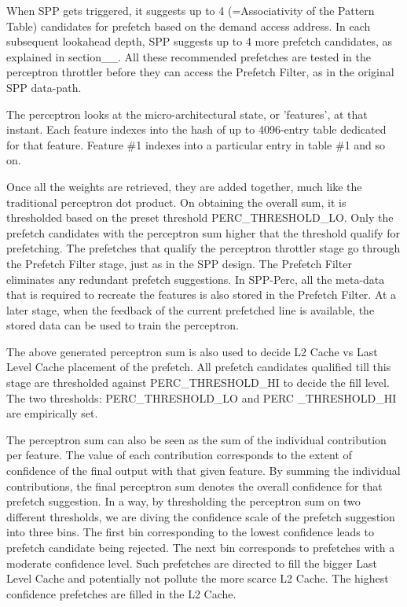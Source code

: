 \documentclass{sig-alternate}
\begin{document}
When SPP gets triggered, it suggests up to 4 (=Associativity of the Pattern Table) candidates for prefetch based on the demand access address. 
In each subsequent lookahead depth, SPP suggests up to 4 more prefetch candidates, as explained in section\_\_. 
All these recommended prefetches are tested in the perceptron throttler before they can access the Prefetch Filter, as in the original SPP data-path.

The perceptron looks at the micro-architectural state, or 'features', at that instant. 
Each feature indexes into the hash of up to 4096-entry table dedicated for that feature. 
Feature \#1 indexes into a particular entry in table \#1 and so on. 

Once all the weights are retrieved, they are added together, much like the traditional perceptron dot product. 
On obtaining the overall sum, it is thresholded based on the preset threshold PERC\_THRESHOLD\_LO. 
Only the prefetch candidates with the perceptron sum higher that the threshold qualify for prefetching. 
The prefetches that qualify the perceptron throttler stage go through the Prefetch Filter stage, just as in the SPP design.
The Prefetch Filter eliminates any redundant prefetch suggestions.
In SPP-Perc, all the meta-data that is required to recreate the features is also stored in the Prefetch Filter. 
At a later stage, when the feedback of the current prefetched line is available, the stored data can be used to train the perceptron. 

The above generated perceptron sum is also used to decide L2 Cache vs Last Level Cache placement of the prefetch. 
All prefetch candidates qualified till this stage are thresholded against PERC\_THRESHOLD\_HI to decide the fill level. The two thresholds: PERC\_THRESHOLD\_LO and PERC \_THRESHOLD\_HI are empirically set. 

The perceptron sum can also be seen as the sum of the individual contribution per feature.
The value of each contribution corresponds to the extent of confidence of the final output with that given feature.
By summing the individual contributions, the final perceptron sum denotes the overall confidence for that prefetch suggestion. 
In a way, by thresholding the perceptron sum on two different thresholds, we are diving the confidence scale of the prefetch suggestion into three bins.
The first bin corresponding to the lowest confidence leads to prefetch candidate being rejected.
The next bin corresponds to prefetches with a moderate confidence level. 
Such prefetches are directed to fill the bigger Last Level Cache and potentially not pollute the more scarce L2 Cache.
The highest confidence prefetches are filled in the L2 Cache.
\end{document}

